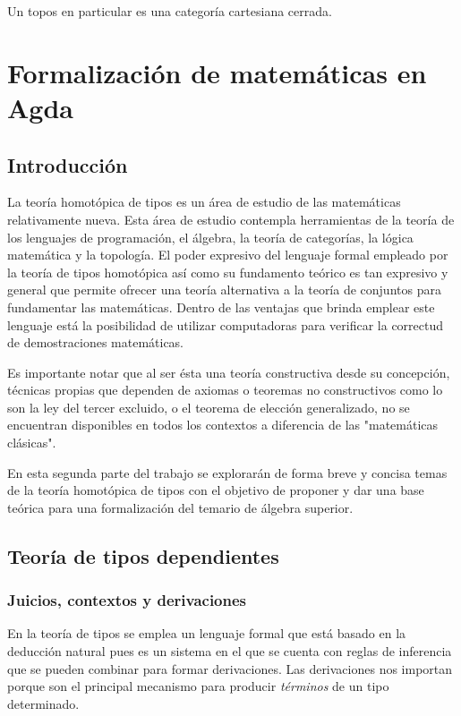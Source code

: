 \documentclass{article}
\begin{document}
\begin{remark}
    Un topos en particular es una categoría cartesiana cerrada.
\end{remark}

\section{Formalización de matemáticas en Agda}

\subsection{Introducción}
La teoría homotópica de tipos es un área de estudio de las matemáticas relativamente nueva. 
Esta área de estudio contempla herramientas de la teoría de los lenguajes de programación, el álgebra, la teoría de categorías, la lógica matemática y la topología.
El poder expresivo del lenguaje formal empleado por la teoría de tipos homotópica así como su fundamento teórico es tan expresivo y general que permite
ofrecer una teoría alternativa a la teoría de conjuntos para fundamentar las matemáticas. Dentro de las ventajas que brinda emplear este lenguaje
está la posibilidad de utilizar computadoras para verificar la correctud de demostraciones matemáticas.

Es importante notar que al ser ésta una teoría constructiva desde su concepción, técnicas propias que dependen de axiomas o teoremas no constructivos como lo son
la ley del tercer excluido, o el teorema de elección generalizado, no se encuentran disponibles en todos los contextos a diferencia de las "matemáticas clásicas".

En esta segunda parte del trabajo se explorarán de forma breve y concisa temas de la teoría homotópica de tipos con el objetivo
de proponer y dar una base teórica para una formalización del temario de álgebra superior.

\subsection{Teoría de tipos dependientes}
    \subsubsection{Juicios, contextos y derivaciones}
        En la teoría de tipos se emplea un lenguaje formal que está basado en la deducción natural pues es un sistema en el que se cuenta
        con reglas de inferencia que se pueden combinar para formar derivaciones. Las derivaciones nos importan porque son el principal
        mecanismo para producir \textit{términos} de un tipo determinado.
        
\end{document}
